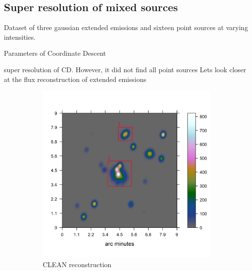 
\subsection{Super resolution of mixed sources}

Dataset of three gaussian extended emissions and sixteen point sources at varying intensities.

Parameters of Coordinate Descent

super resolution of CD. However, it did not find all point sources
Lets look closer at the flux reconstruction of extended emissions

\begin{figure}[h]
	\centering
	\begin{subfigure}[b]{0.4\linewidth}
		\includegraphics[width=\linewidth, trim={0.2in, 0.2in, 0, 0.2in}, clip]{./chapters/20.results/mixed/mixed_clean_boxed.png}
		\caption{CLEAN reconstruction}
		\label{results:mixed:tclean}
	\end{subfigure}
	\begin{subfigure}[b]{0.4\linewidth}

\end{subfigure}
\end{figure}
